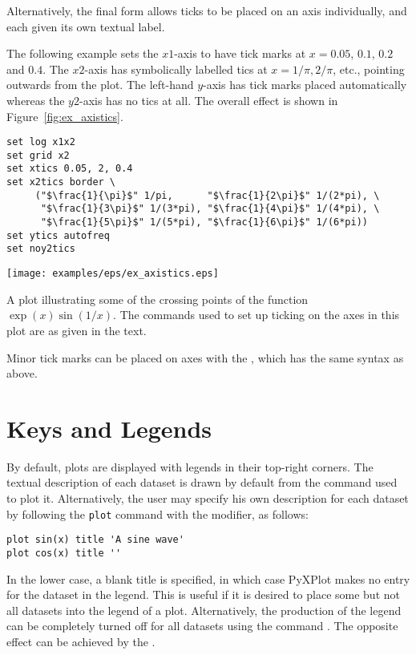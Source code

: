 Alternatively, the final form allows ticks to be placed on an axis
individually, and each given its own textual label.

The following example sets the $x1$-axis to have tick marks at
$x=0.05$, $0.1$, $0.2$ and $0.4$.  The $x2$-axis has symbolically labelled tics at
$x=1/\pi, 2/\pi$, etc., pointing outwards from the plot.  The left-hand
$y$-axis has tick marks placed automatically whereas the $y2$-axis has no tics
at all.  The overall effect is shown in Figure~\ref{fig:ex_axistics}.

\begin{verbatim}
set log x1x2
set grid x2
set xtics 0.05, 2, 0.4
set x2tics border \
     ("$\frac{1}{\pi}$" 1/pi,      "$\frac{1}{2\pi}$" 1/(2*pi), \
      "$\frac{1}{3\pi}$" 1/(3*pi), "$\frac{1}{4\pi}$" 1/(4*pi), \
      "$\frac{1}{5\pi}$" 1/(5*pi), "$\frac{1}{6\pi}$" 1/(6*pi))
set ytics autofreq
set noy2tics
\end{verbatim}

\begin{example}
\begin{center}
\texttt{[image: examples/eps/ex\_axistics.eps]}
\end{center}
\caption[A plot demonsrating the use of custom axis ticks]
{A plot illustrating some of the crossing points of the function
$\exp(x)\sin(1/x)$.  The commands used to set up ticking on the axes in this
plot are as given in the text.}
\label{fig:ex_axistics}
\end{example}

Minor tick marks can be placed on axes with the , which has
the same syntax as above.

\section{Keys and Legends}\index{keys}\index{legends}

By default, plots are displayed with legends in their top-right corners. The
textual description of each dataset is drawn by default from the command used
to plot it. Alternatively, the user may specify his own description for each
dataset by following the {\tt plot} command with the \indmodt{title} modifier,
as follows:

\begin{verbatim}
plot sin(x) title 'A sine wave'
plot cos(x) title ''
\end{verbatim}

In the lower case, a blank title is specified, in which case PyXPlot makes no
entry for the dataset in the legend. This is useful if it is desired to place
some but not all datasets into the legend of a plot.  Alternatively, the
production of the legend can be completely turned off for all datasets using
the command \indcmdts{set nokey}. The opposite effect can be achieved by the
\indcmdt{set key}.

